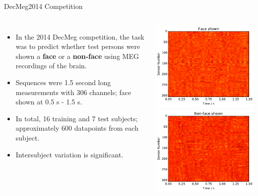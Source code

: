 \documentclass[10pt, aspectratio=169]{beamer} %
\begin{document}
\begin{frame}{DecMeg2014 Competition}
\begin{columns}
\begin{itemize}
\item In the 2014 DecMeg competition, the task was to predict whether
test persons were shown a \textbf{face} or a \textbf{non-face} using
MEG recordings of the brain.
\item Sequences were 1.5 second long measurements with 306 channels; face shown at 0.5 s - 1.5 s.
\item In total, 16 training and 7 test subjects; approximately 600 datapoints from each subject.
\item Intersubject variation is significant.
\end{itemize}
\includegraphics[width=1.0\columnwidth]{images/Face.pdf}\\
\includegraphics[width=1.0\columnwidth]{images/Non-Face.pdf}
\end{columns}
\end{frame}
\end{document}

